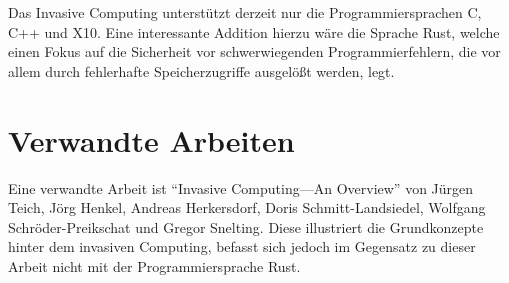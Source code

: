 Das Invasive Computing unterstützt derzeit nur die Programmiersprachen C, C++ und X10. Eine interessante Addition hierzu wäre
die Sprache Rust, welche einen Fokus auf die Sicherheit vor schwerwiegenden Programmierfehlern, die vor allem durch
fehlerhafte Speicherzugriffe ausgelößt werden, legt.

\section{Verwandte Arbeiten}

Eine verwandte Arbeit ist "`Invasive Computing—An Overview"'\cite{teich11msoc} von Jürgen Teich, Jörg Henkel, Andreas Herkersdorf,
Doris Schmitt-Landsiedel, Wolfgang Schröder-Preikschat und Gregor Snelting.
Diese illustriert die Grundkonzepte hinter dem invasiven Computing, befasst sich jedoch im Gegensatz zu dieser Arbeit nicht mit der
Programmiersprache Rust.
